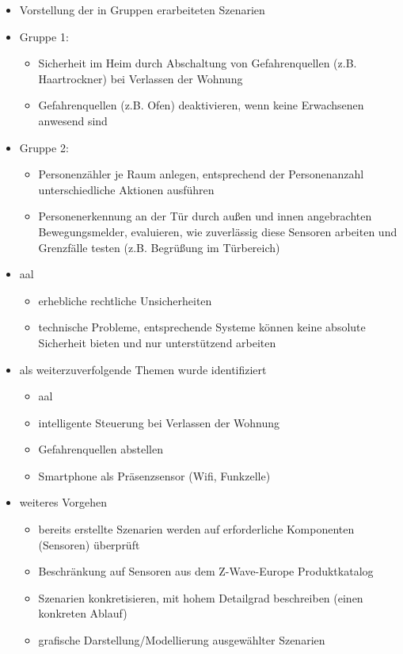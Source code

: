 \begin{itemize}
	\item Vorstellung der in Gruppen erarbeiteten Szenarien
	\item Gruppe 1:
	\begin{itemize}
		\item Sicherheit im Heim durch Abschaltung von Gefahrenquellen (z.B. Haartrockner) bei Verlassen der Wohnung
		\item Gefahrenquellen (z.B. Ofen) deaktivieren, wenn keine Erwachsenen anwesend sind
	\end{itemize}
	\item Gruppe 2:
	\begin{itemize}
		\item Personenzähler je Raum anlegen, entsprechend der Personenanzahl unterschiedliche Aktionen ausführen
		\item Personenerkennung an der Tür durch außen und innen angebrachten Bewegungsmelder, evaluieren, wie zuverlässig diese Sensoren arbeiten und Grenzfälle testen (z.B. Begrüßung im Türbereich)
	\end{itemize}
	\item \gls{aal}
	\begin{itemize}
		\item erhebliche rechtliche Unsicherheiten
		\item technische Probleme, entsprechende Systeme können keine absolute Sicherheit bieten und nur unterstützend arbeiten
	\end{itemize}
	\item als weiterzuverfolgende Themen wurde identifiziert
	\begin{itemize}
		\item \gls{aal}
		\item intelligente Steuerung bei Verlassen der Wohnung
		\item Gefahrenquellen abstellen
		\item Smartphone als Präsenzsensor (Wifi, Funkzelle)
	\end{itemize}
	\item weiteres Vorgehen
	\begin{itemize}
		\item bereits erstellte Szenarien werden auf erforderliche Komponenten (Sensoren) überprüft
		\item Beschränkung auf Sensoren aus dem Z-Wave-Europe Produktkatalog
		\item Szenarien konkretisieren, mit hohem Detailgrad beschreiben (einen konkreten Ablauf)
		\item grafische Darstellung/Modellierung ausgewählter Szenarien
	\end{itemize}
\end{itemize}

